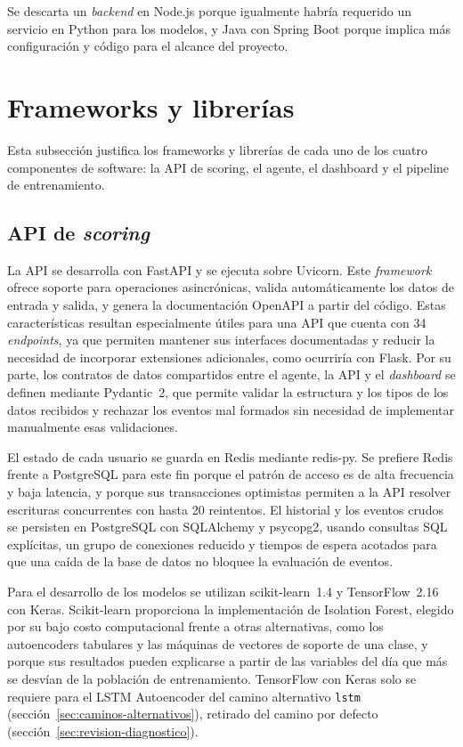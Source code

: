 Se descarta un \emph{backend} en Node.js porque igualmente habría requerido un servicio en Python para los modelos, y Java con Spring Boot porque implica más configuración y código para el alcance del proyecto.

\section{Frameworks y librerías}
\label{sec:frameworks}

Esta subsección justifica los frameworks y librerías de cada uno de los cuatro componentes de software: la API de scoring, el agente, el dashboard y el pipeline de entrenamiento.

\subsection{API de \emph{scoring}}
La API se desarrolla con FastAPI y se ejecuta sobre Uvicorn. Este \emph{framework} ofrece soporte para operaciones asincrónicas, valida automáticamente los datos de entrada y salida, y genera la documentación OpenAPI a partir del código. Estas características resultan especialmente útiles para una API que cuenta con 34 \emph{endpoints}, ya que permiten mantener sus interfaces documentadas y reducir la necesidad de incorporar extensiones adicionales, como ocurriría con Flask. Por su parte, los contratos de datos compartidos entre el agente, la API y el \emph{dashboard} se definen mediante Pydantic~2, que permite validar la estructura y los tipos de los datos recibidos y rechazar los eventos mal formados sin necesidad de implementar manualmente esas validaciones.

El estado de cada usuario se guarda en Redis mediante redis-py. Se prefiere Redis frente a PostgreSQL para este fin porque el patrón de acceso es de alta frecuencia y baja latencia, y porque sus transacciones optimistas permiten a la API resolver escrituras concurrentes con hasta 20 reintentos. El historial y los eventos crudos se persisten en PostgreSQL con SQLAlchemy y psycopg2, usando consultas SQL explícitas, un grupo de conexiones reducido y tiempos de espera acotados para que una caída de la base de datos no bloquee la evaluación de eventos.

Para el desarrollo de los modelos se utilizan scikit-learn~1.4 y TensorFlow~2.16 con Keras. Scikit-learn proporciona la implementación de Isolation Forest, elegido por su bajo costo computacional frente a otras alternativas, como los autoencoders tabulares y las máquinas de vectores de soporte de una clase, y porque sus resultados pueden explicarse a partir de las variables del día que más se desvían de la población de entrenamiento. TensorFlow con Keras solo se requiere para el LSTM Autoencoder del camino alternativo \texttt{lstm} (sección~\ref{sec:caminos-alternativos}), retirado del camino por defecto (sección~\ref{sec:revision-diagnostico}).

